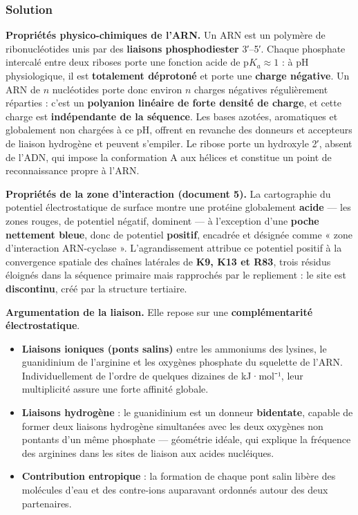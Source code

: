 \documentclass[11pt,a4paper]{article}
\providecommand{\tightlist}{\setlength{\itemsep}{0pt}\setlength{\parskip}{0pt}}
\begin{document}
\hypertarget{solution-13}{%
\subsubsection{Solution}\label{solution-13}}

\textbf{Propriétés physico-chimiques de l'ARN.} Un ARN est un polymère de ribonucléotides unis par des \textbf{liaisons phosphodiester} 3′--5′. Chaque phosphate intercalé entre deux riboses porte une fonction acide de p\(K_{a} \approx 1\) : à pH physiologique, il est \textbf{totalement déprotoné} et porte une \textbf{charge négative}. Un ARN de \(n\) nucléotides porte donc environ \(n\) charges négatives régulièrement réparties : c'est un \textbf{polyanion linéaire de forte densité de charge}, et cette charge est \textbf{indépendante de la séquence}. Les bases azotées, aromatiques et globalement non chargées à ce pH, offrent en revanche des donneurs et accepteurs de liaison hydrogène et peuvent s'empiler. Le ribose porte un hydroxyle 2′, absent de l'ADN, qui impose la conformation A aux hélices et constitue un point de reconnaissance propre à l'ARN.

\textbf{Propriétés de la zone d'interaction (document 5).} La cartographie du potentiel électrostatique de surface montre une protéine globalement \textbf{acide} --- les zones rouges, de potentiel négatif, dominent --- à l'exception d'une \textbf{poche nettement bleue}, donc de potentiel \textbf{positif}, encadrée et désignée comme « zone d'interaction ARN-cyclase ». L'agrandissement attribue ce potentiel positif à la convergence spatiale des chaînes latérales de \textbf{K9, K13 et R83}, trois résidus éloignés dans la séquence primaire mais rapprochés par le repliement : le site est \textbf{discontinu}, créé par la structure tertiaire.

\textbf{Argumentation de la liaison.} Elle repose sur une \textbf{complémentarité électrostatique}.

\begin{itemize}
\tightlist
\item
  \textbf{Liaisons ioniques (ponts salins)} entre les ammoniums des lysines, le guanidinium de l'arginine et les oxygènes phosphate du squelette de l'ARN. Individuellement de l'ordre de quelques dizaines de kJ·mol⁻¹, leur multiplicité assure une forte affinité globale.
\item
  \textbf{Liaisons hydrogène} : le guanidinium est un donneur \textbf{bidentate}, capable de former deux liaisons hydrogène simultanées avec les deux oxygènes non pontants d'un même phosphate --- géométrie idéale, qui explique la fréquence des arginines dans les sites de liaison aux acides nucléiques.
\item
  \textbf{Contribution entropique} : la formation de chaque pont salin libère des molécules d'eau et des contre-ions auparavant ordonnés autour des deux partenaires.
\end{itemize}
\end{document}
